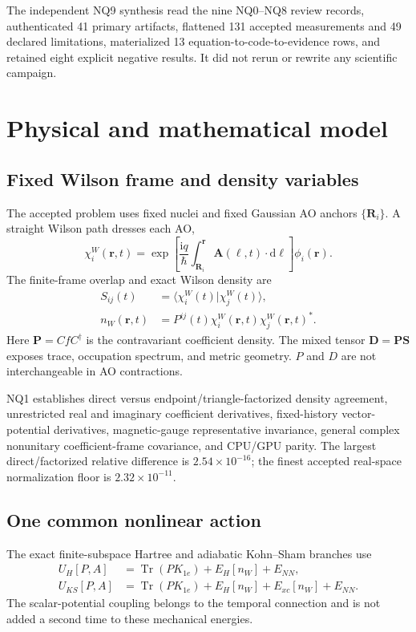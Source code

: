 \documentclass[11pt]{article}
\newcommand{\iu}{\mathrm{i}}
\newcommand{\dd}{\mathrm{d}}
\newcommand{\Tr}{\operatorname{Tr}}
\newcommand{\A}{\mathbf A}
\newcommand{\rvec}{\mathbf r}
\newcommand{\Smat}{\mathbf S}
\newcommand{\Pmat}{\mathbf P}
\newcommand{\Dmat}{\mathbf D}
\begin{document}
The independent NQ9 synthesis read the nine NQ0--NQ8 review records,
authenticated 41 primary artifacts, flattened 131 accepted measurements and
49 declared limitations, materialized 13 equation-to-code-to-evidence rows,
and retained eight explicit negative results.  It did not rerun or rewrite
any scientific campaign.

\section{Physical and mathematical model}

\subsection{Fixed Wilson frame and density variables}

The accepted problem uses fixed nuclei and fixed Gaussian AO anchors
$\{\mathbf R_i\}$.  A straight Wilson path dresses each AO,
\begin{equation}
  \chi_i^W(\rvec,t)
  =\exp\!\left[\frac{\iu q}{\hbar}
    \int_{\mathbf R_i}^{\rvec}\A(\boldsymbol\ell,t)\cdot\dd\boldsymbol\ell
  \right]\phi_i(\rvec).
\end{equation}
The finite-frame overlap and exact Wilson density are
\begin{align}
 S_{ij}(t)&=\langle\chi_i^W(t)|\chi_j^W(t)\rangle,\\
 n_W(\rvec,t)&=P^{ij}(t)\chi_i^W(\rvec,t)\chi_j^W(\rvec,t)^*.
\end{align}
Here $\Pmat=C f C^\dagger$ is the contravariant coefficient density.  The
mixed tensor $\Dmat=\Pmat\Smat$ exposes trace, occupation spectrum, and
metric geometry.  $P$ and $D$ are not interchangeable in AO contractions.

NQ1 establishes direct versus endpoint/triangle-factorized density
agreement, unrestricted real and imaginary coefficient derivatives,
fixed-history vector-potential derivatives, magnetic-gauge representative
invariance, general complex nonunitary coefficient-frame covariance, and
CPU/GPU parity.  The largest direct/factorized relative difference is
$2.54\times10^{-16}$; the finest accepted real-space normalization floor is
$2.32\times10^{-11}$.

\subsection{One common nonlinear action}

The exact finite-subspace Hartree and adiabatic Kohn--Sham branches use
\begin{align}
 U_H[P,A] &= \Tr(PK_{1e})+E_H[n_W]+E_{NN},\\
 U_{KS}[P,A] &= \Tr(PK_{1e})+E_H[n_W]+E_{xc}[n_W]+E_{NN}.
\end{align}
The scalar-potential coupling belongs to the temporal connection and is not
added a second time to these mechanical energies.
\end{document}
